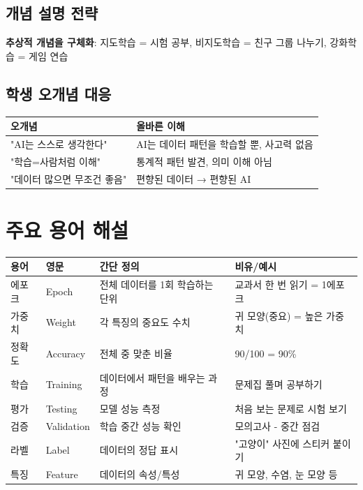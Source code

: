\documentclass[11pt,a4paper]{article}
\begin{document}
\subsection{개념 설명 전략}
\textbf{추상적 개념을 구체화}:
지도학습 = 시험 공부, 비지도학습 = 친구 그룹 나누기, 강화학습 = 게임 연습

\subsection{학생 오개념 대응}

\begin{center}
\begin{tabular}{L{5.5cm}L{7.5cm}}
\toprule
\textbf{오개념} & \textbf{올바른 이해} \\
\midrule
"AI는 스스로 생각한다" & AI는 데이터 패턴을 학습할 뿐, 사고력 없음 \\
"학습=사람처럼 이해" & 통계적 패턴 발견, 의미 이해 아님 \\
"데이터 많으면 무조건 좋음" & 편향된 데이터 → 편향된 AI \\
\bottomrule
\end{tabular}
\end{center}

\section{주요 용어 해설}

\begin{center}
\small
\begin{longtable}{L{2cm}L{2cm}L{4cm}L{4.5cm}}
\toprule
\textbf{용어} & \textbf{영문} & \textbf{간단 정의} & \textbf{비유/예시} \\
\midrule
\endhead
에포크 & Epoch & 전체 데이터를 1회 학습하는 단위 & 교과서 한 번 읽기 = 1에포크 \\
\midrule
가중치 & Weight & 각 특징의 중요도 수치 & 귀 모양(중요) = 높은 가중치 \\
\midrule
정확도 & Accuracy & 전체 중 맞춘 비율 & 90/100 = 90\% \\
\midrule
학습 & Training & 데이터에서 패턴을 배우는 과정 & 문제집 풀며 공부하기 \\
\midrule
평가 & Testing & 모델 성능 측정 & 처음 보는 문제로 시험 보기 \\
\midrule
검증 & Validation & 학습 중간 성능 확인 & 모의고사 - 중간 점검 \\
\midrule
라벨 & Label & 데이터의 정답 표시 & "고양이" 사진에 스티커 붙이기 \\
\midrule
특징 & Feature & 데이터의 속성/특성 & 귀 모양, 수염, 눈 모양 등 \\
\bottomrule
\end{longtable}
\end{center}
\end{document}
